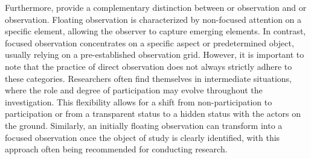 \begin{refsegment}
Furthermore, \textcolor{blue}{\textcite[16-19]{corbille_espace_2020}} provide a complementary distinction between  or  observation and  or  observation. Floating observation is characterized by non-focused attention on a specific element, allowing the observer to capture emerging elements. In contrast, focused observation concentrates on a specific aspect or predetermined object, usually relying on a pre-established observation grid. However, it is important to note that the practice of direct observation does not always strictly adhere to these categories. Researchers often find themselves in intermediate situations, where the role and degree of participation may evolve throughout the investigation. This flexibility allows for a shift from non-participation to participation or from a transparent status to a hidden status with the actors on the ground. Similarly, an initially floating observation can transform into a focused observation once the object of study is clearly identified, with this approach often being recommended for conducting research.%


\end{refsegment}
